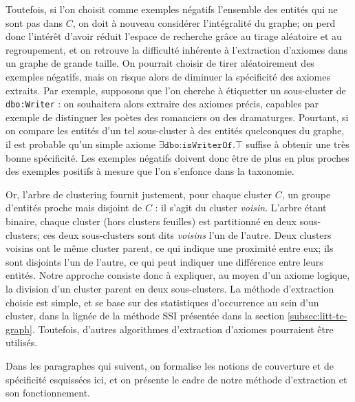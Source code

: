 Toutefois, si l'on choisit comme exemples négatifs l'ensemble des entités qui ne sont pas dans $C$, on doit à nouveau considérer l'intégralité du graphe; on perd donc l'intérêt d'avoir réduit l'espace de recherche grâce au tirage aléatoire et au regroupement, et on retrouve la difficulté inhérente à l'extraction d'axiomes dans un graphe de grande taille.
On pourrait choisir de tirer aléatoirement des exemples négatifs, mais on risque alors de diminuer la spécificité des axiomes extraits. Par exemple, supposons que l'on cherche à étiquetter un sous-cluster de \texttt{dbo:Writer} : on souhaitera alors extraire des axiomes précis, capables par exemple de distinguer les poètes des romanciers ou des dramaturges. Pourtant, si on compare les entités d'un tel sous-cluster à des entités quelconques du graphe, il est probable qu'un simple axiome $\exists \texttt{dbo:isWriterOf}.\top$ suffise à obtenir une très bonne spécificité. Les exemples négatifs doivent donc être de plus en plus proches des exemples positifs à mesure que l'on s'enfonce dans la taxonomie.


Or, l'arbre de clustering fournit justement, pour chaque cluster $C$, un groupe d'entités proche mais disjoint de $C$ : il s'agit du cluster \textit{voisin}. L'arbre étant binaire, chaque cluster (hors clusters feuilles) est partitionné en deux sous-clusters; ces deux sous-clusters sont dits \textit{voisins} l'un de l'autre. Deux clusters voisins ont le même cluster parent, ce qui indique une proximité entre eux; ils sont disjoints l'un de l'autre, ce qui peut indiquer une différence entre leurs entités. Notre approche consiste donc à expliquer, au moyen d'un axiome logique, la division d'un cluster parent en deux sous-clusters. 
La méthode d'extraction choisie est simple, et se base sur des statistiques d'occurrence au sein d'un cluster, dans la lignée de la méthode SSI présentée dans la section \ref{subsec:litt-te-graph}. %
Toutefois, d'autres algorithmes d'extraction d'axiomes pourraient être utilisés. 

Dans les paragraphes qui suivent, on formalise les notions de couverture et de spécificité esquissées ici, et on présente le cadre de notre méthode d'extraction et son fonctionnement.


